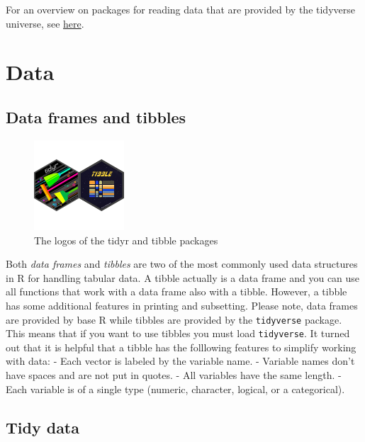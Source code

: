 \documentclass[
  12pt,
  oneside]{book}
\theoremstyle{definition}
\theoremstyle{definition}
\theoremstyle{definition}
\theoremstyle{definition}
\theoremstyle{remark}
\begin{document}
For an overview on packages for reading data that are provided by the tidyverse universe, see \href{https://www.tidyverse.org/packages/\#import}{here}.

\hypertarget{sec:tidy}{%
\section{Data}\label{sec:tidy}}

\hypertarget{data-frames-and-tibbles}{%
\subsection{Data frames and tibbles}\label{data-frames-and-tibbles}}

\begin{figure}
\centering
\includegraphics[width=0.3\textwidth,height=\textheight]{fig/tidyr-tibble-logo.png}
\caption{\label{fig:tidyr-tibble-logo} The logos of the tidyr and tibble packages}
\end{figure}

Both \emph{data frames} and \emph{tibbles} are two of the most commonly used data structures in R for handling tabular data. A tibble actually is a data frame and you can use all functions that work with a data frame also with a tibble. However, a tibble has some additional features in printing and subsetting. Please note, data frames are provided by base R while tibbles are provided by the \texttt{tidyverse} package. This means that if you want to use tibbles you must load \texttt{tidyverse}. It turned out that it is helpful that a tibble has the folllowing features to simplify working with data:
- Each vector is labeled by the variable name.
- Variable names don't have spaces and are not put in quotes.
- All variables have the same length.
- Each variable is of a single type (numeric, character, logical, or a categorical).

\hypertarget{tidy-data}{%
\subsection{Tidy data}\label{tidy-data}}
\end{document}
